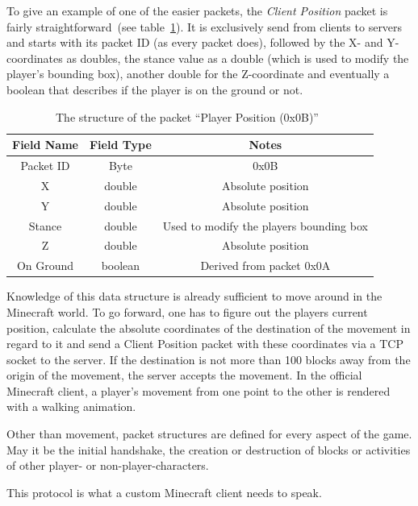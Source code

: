 To give an example of one of the easier packets, the \emph{Client Position} packet is fairly straightforward~(see table~\ref{mc_packet}). It is exclusively send from clients to servers and starts with its packet ID (as every packet does), followed by the X- and Y-coordinates as doubles, the stance value as a double (which is used to modify the player's bounding box), another double for the Z-coordinate and eventually a boolean that describes if the player is on the ground or not.~\cite{protocol}

\begin{table}[htb]
\centering
\begin{tabular}{|c|c|c|}\hline

    Field Name & Field Type & Notes \\ \hline
   Packet ID & Byte & 0x0B \\ \hline
   X & double & Absolute position \\ \hline
   Y & double & Absolute position \\ \hline
   Stance & double & Used to modify the players bounding box \\ \hline
   Z & double & Absolute position \\ \hline
   On Ground & boolean & Derived from packet 0x0A \\ \hline
   
\end{tabular}
\caption{The structure of the packet ``Player Position (0x0B)''~\cite{protocol}}
\label{mc_packet}
\end{table}

Knowledge of this data structure is already sufficient to move around in the Minecraft world. To go forward, one has to figure out the players current position, calculate the absolute coordinates of the destination of the movement in regard to it and send a Client Position packet with these coordinates via a TCP socket to the server. If the destination is not more than 100 blocks away from the origin of the movement, the server accepts the movement. In the official Minecraft client, a player's movement from one point to the other is rendered with a walking animation.

Other than movement, packet structures are defined for every aspect of the game. May it be the initial handshake, the creation or destruction of blocks or activities of other player- or non-player-characters.

This protocol is what a custom Minecraft client needs to speak.

